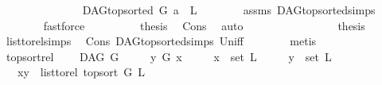 \begin{isabellebody}
\isanewline
\ \ \ \ \isamarkupfalse%
\ {}\isanewline
\ \ \ \ \isamarkupfalse%
\ \isamarkupfalse%
\ {\isachardoublequoteopen}{\isasymnot}\ DAG{\isachardot}{\kern0pt}top{\isacharunderscore}{\kern0pt}sorted\ G\ {\isacharparenleft}{\kern0pt}a\ {\isacharhash}{\kern0pt}\ L{\isacharparenright}{\kern0pt}{\isachardoublequoteclose}\isanewline
\ \ \ \ \ \ \isamarkupfalse%
\ assms\ DAG{\isachardot}{\kern0pt}top{\isacharunderscore}{\kern0pt}sorted{\isachardot}{\kern0pt}simps{\isacharparenleft}{\kern0pt}{}{\isacharparenright}{\kern0pt}\isanewline
\ \ \ \ \ \ \isamarkupfalse%
\ fastforce\ \ \isanewline
\ \ \ \ \isamarkupfalse%
\ \isamarkupfalse%
\ {\isacharquery}{\kern0pt}thesis\ \isamarkupfalse%
\ Cons\ \isamarkupfalse%
\ auto\isanewline
\ \ \isamarkupfalse%
\isanewline
\ \ \ \ \isamarkupfalse%
\ {}\isanewline
\ \ \ \ \isamarkupfalse%
\ \isamarkupfalse%
\ {\isacharquery}{\kern0pt}thesis\ \isamarkupfalse%
\ list{\isacharunderscore}{\kern0pt}to{\isacharunderscore}{\kern0pt}rel{\isachardot}{\kern0pt}simps\ \isamarkupfalse%
\ Cons\ DAG{\isachardot}{\kern0pt}top{\isacharunderscore}{\kern0pt}sorted{\isachardot}{\kern0pt}simps{\isacharparenleft}{\kern0pt}{}{\isacharparenright}{\kern0pt}\ Un{\isacharunderscore}{\kern0pt}iff\isanewline
\ \ \ \ \ \ \isamarkupfalse%
\ metis\ \ \isanewline
\ \ \isamarkupfalse%
\isanewline
{}\isamarkupfalse%
%
\endisatagproof
{\isafoldproof}%
%
\isadelimproof
\isanewline
%
\endisadelimproof
\isanewline
{}\isamarkupfalse%
\ top{\isacharunderscore}{\kern0pt}sort{\isacharunderscore}{\kern0pt}rel{\isacharcolon}{\kern0pt}\ \isanewline
\ \ \ {\isachardoublequoteopen}DAG\ G{\isachardoublequoteclose}\isanewline
\ \ \ \ \ {\isachardoublequoteopen}y\ {\isasymrightarrow}\isactrlsup {\isacharplus}{\kern0pt}\isactrlbsub G\isactrlesub \ x{\isachardoublequoteclose}\isanewline
\ \ \ \ \ {\isachardoublequoteopen}x\ {\isasymin}\ set\ L{\isachardoublequoteclose}\isanewline
\ \ \ \ \ {\isachardoublequoteopen}y\ {\isasymin}\ set\ L{\isachardoublequoteclose}\isanewline
\ \ \ {\isachardoublequoteopen}{\isacharparenleft}{\kern0pt}x{\isacharcomma}{\kern0pt}y{\isacharparenright}{\kern0pt}\ {\isasymin}\ list{\isacharunderscore}{\kern0pt}to{\isacharunderscore}{\kern0pt}rel\ {\isacharparenleft}{\kern0pt}top{\isacharunderscore}{\kern0pt}sort\ G\ L{\isacharparenright}{\kern0pt}{\isachardoublequoteclose}\isanewline

\end{isabellebody}
